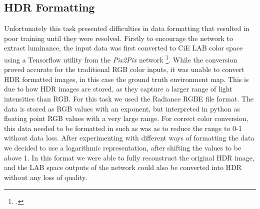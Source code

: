 \documentclass[ %
                    author={Gavin Parker},
                supervisor={Dr. Neill Campbell},
                    degree={MEng},
                     title={Deep Siamese Networks for Illumination Estimation from Stereo Images},
                  subtitle={},
                      type={Research},
                      year={2018} ]{dissertation}
\begin{document}
\subsection{HDR Formatting}
Unfortunately this task presented difficulties in data formatting that resulted in poor training until they were resolved. Firstly to encourage the network to extract luminance, the input data was first converted to CiE LAB color space using a Tensorflow utility from the \textit{Pix2Pix} network \footcite{https://github.com/affinelayer/pix2pix-tensorflow/blob/master/pix2pix.py}. While the conversion proved accurate for the traditional RGB color inputs, it was unable to convert HDR formatted images, in this case the ground truth environment map. This is due to how HDR images are stored, as they capture a larger range of light intensities than RGB. For this task we used the Radiance RGBE file format. The data is stored as RGB values with an exponent, but interpreted in python as floating point RGB values with a very large range. For correct color conversion, this data needed to be formatted in such as was as to reduce the range to 0-1 without data loss. After experimenting with different ways of formatting the data we decided to use a logarithmic representation, after shifting the values to be above 1. In this format we were able to fully reconstruct the original HDR image, and the LAB space outputs of the network could also be converted into HDR without any loss of quality.
\end{document}

